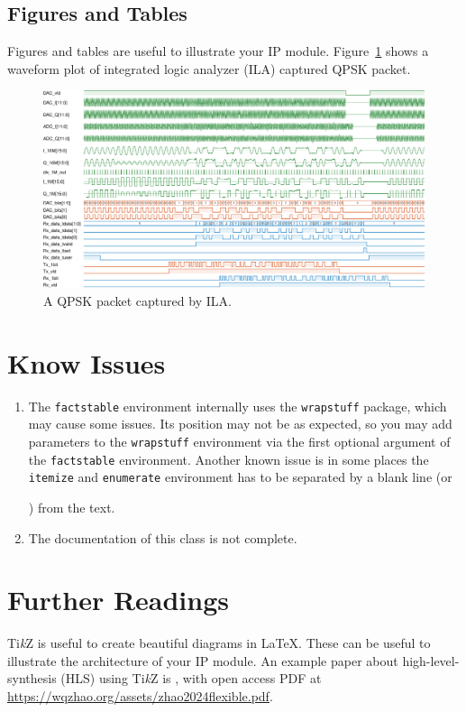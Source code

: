 \documentclass{ip-doc}
\begin{document}
\subsection{Figures and Tables}
Figures and tables are useful to illustrate your IP module.
Figure~\ref{fig:example} shows a waveform plot of integrated logic analyzer (ILA) captured QPSK packet.
\begin{figure}[htbp]
  \includegraphics[width=\linewidth]{fig/ila_QPSK-crop.pdf}
  \caption{A QPSK packet captured by ILA. \cite{zhao2024dual}}
  \label{fig:example}
\end{figure}

\section{Know Issues}
\begin{enumerate}
  \item The \texttt{factstable} environment internally uses the \texttt{wrapstuff} package, which may cause some issues.
  Its position may not be as expected, so you may add parameters to the \texttt{wrapstuff} environment via the first optional argument of the \texttt{factstable} environment.
  Another known issue is in some places the \texttt{itemize} and \texttt{enumerate} environment has to be separated by a blank line (or {\ttfamily\string\par\relax}) from the text.
  \item The documentation of this class is not complete.
\end{enumerate}

\section{Further Readings}
Ti\textit{k}Z is useful to create beautiful diagrams in \LaTeX.
These can be useful to illustrate the architecture of your IP module.
An example paper about high-level-synthesis (HLS) using Ti\textit{k}Z is \cite{zhao2024flexible},
with open access PDF at \url{https://wqzhao.org/assets/zhao2024flexible.pdf}.


{\small}
\end{document}
